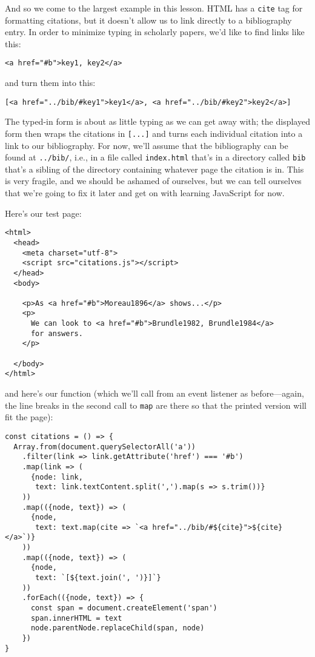 And so we come to the largest example in this lesson.
HTML has a \texttt{cite} tag for formatting citations,
but it doesn't allow us to link directly to a bibliography entry.
In order to minimize typing in scholarly papers,
we'd like to find links like this:

\begin{verbatim}
<a href="#b">key1, key2</a>
\end{verbatim}

\noindent
and turn them into this:

\begin{verbatim}
[<a href="../bib/#key1">key1</a>, <a href="../bib/#key2">key2</a>]
\end{verbatim}

The typed-in form is about as little typing as we can get away with;
the displayed form then wraps the citations in \texttt{[...]}
and turns each individual citation into a link to our bibliography.
For now,
we'll assume that the bibliography can be found at \texttt{../bib/},
i.e.,
in a file called \texttt{index.html} that's in a directory called \texttt{bib}
that's a sibling of the directory containing whatever page the citation is in.
This is very fragile,
and we should be ashamed of ourselves,
but we can tell ourselves that we're going to fix it later
and get on with learning JavaScript for now.

Here's our test page:

\begin{verbatim}
<html>
  <head>
    <meta charset="utf-8">
    <script src="citations.js"></script>
  </head>
  <body>

    <p>As <a href="#b">Moreau1896</a> shows...</p>
    <p>
      We can look to <a href="#b">Brundle1982, Brundle1984</a>
      for answers.
    </p>

  </body>
</html>
\end{verbatim}

\noindent
and here's our function
(which we'll call from an event listener as before---again,
the line breaks in the second call to \texttt{map} are there
so that the printed version will fit the page):

\begin{verbatim}
const citations = () => {
  Array.from(document.querySelectorAll('a'))
    .filter(link => link.getAttribute('href') === '#b')
    .map(link => (
      {node: link,
       text: link.textContent.split(',').map(s => s.trim())}
    ))
    .map(({node, text}) => (
      {node,
       text: text.map(cite => `<a href="../bib/#${cite}">${cite}</a>`)}
    ))
    .map(({node, text}) => (
      {node,
       text: `[${text.join(', ')}]`}
    ))
    .forEach(({node, text}) => {
      const span = document.createElement('span')
      span.innerHTML = text
      node.parentNode.replaceChild(span, node)
    })
}
\end{verbatim}

